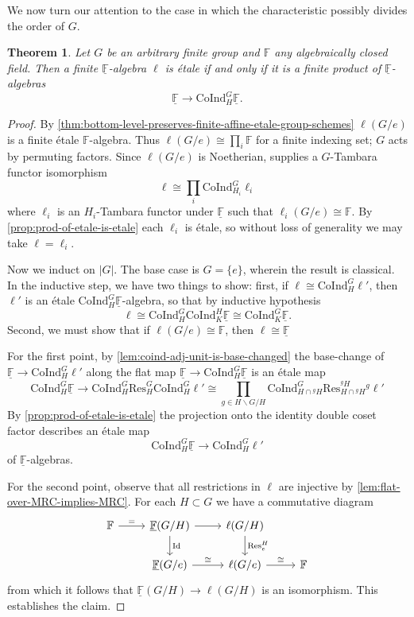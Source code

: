\documentclass[11pt,dvipsnames]{amsart}
\newcommand{\F}{\mathbb{F}}
\newtheorem{theorem}{Theorem}[section]
\theoremstyle{BoldRemark}
\newcommand{\Res}{\mathrm{Res}}
\newcommand{\Coind}{\mathrm{CoInd}}
\begin{document}
We now turn our attention to the case in which the characteristic possibly divides the order of $G$.

\begin{theorem}\label{thm:modular-characteristic-characterizing-finite-etale}
	Let $G$ be an arbitrary finite group and $\F$ any algebraically closed field. Then a finite $\underline{\F}$-algebra $\ell$ is \'{e}tale if and only if it is a finite product of $\underline{\F}$-algebras 
    \[ 
        \underline{\F} \rightarrow \Coind_H^G \underline{\F} . 
    \]
\end{theorem}

\begin{proof}
    By \cref{thm:bottom-level-preserves-finite-affine-etale-group-schemes} $\ell(G/e)$ is a finite \'{e}tale $\F$-algebra. Thus $\ell(G/e) \cong \prod_i \F$ for a finite indexing set; $G$ acts by permuting factors. Since $\ell(G/e)$ is Noetherian, \cite[Theorem D]{Wis25a} supplies a $G$-Tambara functor isomorphism 
    \[ 
		\ell \cong \prod_i \Coind_{H_i}^G \ell_i
	\] 
	where $\ell_i$ is an $H_i$-Tambara functor under $\underline{\F}$ such that $\ell_i(G/e) \cong \F$. By \cref{prop:prod-of-etale-is-etale} each $\ell_i$ is \'{e}tale, so without loss of generality we may take $\ell = \ell_i$.

    Now we induct on $|G|$. The base case is $G = \{ e \}$, wherein the result is classical. In the inductive step, we have two things to show: first, if $\ell \cong \Coind_H^G \ell'$, then $\ell'$ is an \'{e}tale $\Coind_H^G \underline{\F}$-algebra, so that by inductive hypothesis 
    \[ 
        \ell \cong \Coind_H^G \Coind_K^H \underline{\F} \cong \Coind_K^G \underline{\F} . 
    \] 
    Second, we must show that if $\ell(G/e) \cong \F$, then $\ell \cong \underline{\F}$

    For the first point, by \cref{lem:coind-adj-unit-is-base-changed} the base-change of $\underline{\F} \rightarrow \Coind_H^G \ell'$ along the flat map $\underline{\F} \rightarrow \Coind_H^G \underline{\F}$ is an \'{e}tale map 
    \[ 
        \Coind_H^G \underline{\F} \rightarrow \Coind_H^G \Res_H^G \Coind_H^G \ell' \cong \prod_{g \in H \backslash G / H} \Coind_{H \cap {}^g H}^G \Res_{H \cap {}^g H}^{{}^g H} {}^g \ell'
    \]
    By \cref{prop:prod-of-etale-is-etale} the projection onto the identity double coset factor describes an \'{e}tale map 
    \[ 
        \Coind_H^G \underline{\F} \rightarrow \Coind_H^G \ell' 
    \] 
    of $\underline{\F}$-algebras.
    
    For the second point, observe that all restrictions in $\ell$ are injective by \cref{lem:flat-over-MRC-implies-MRC}. For each $H \subset G$ we have a commutative diagram 
    \[ \begin{tikzcd} 
        \F \arrow[r, "="] & \underline{\F}(G/H) \arrow[r] \arrow[d, "\mathrm{Id}"] & \ell(G/H) \arrow[d, "\Res_e^H"] & \\
         & \underline{\F}(G/e) \arrow[r, "\cong"] & \ell(G/e) \arrow[r, "\cong"] & \F
    \end{tikzcd} \]
    from which it follows that $\underline{\F}(G/H) \rightarrow \ell(G/H)$ is an isomorphism. This establishes the claim.
\end{proof}
\end{document}
